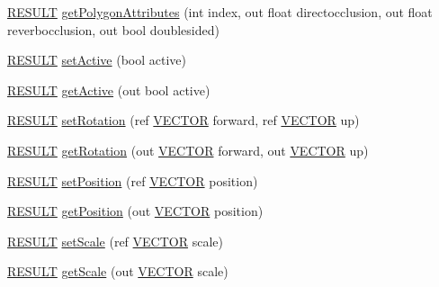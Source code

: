 \begin{DoxyCompactItemize}
\hyperlink{namespace_f_m_o_d_a305d1176ef3f8c8815861a60407ac33d}{R\+E\+S\+U\+LT} \hyperlink{class_f_m_o_d_1_1_geometry_a5993fb0a4a428a9de5262a6254daeeef}{get\+Polygon\+Attributes} (int index, out float directocclusion, out float reverbocclusion, out bool doublesided)
\item 
\hyperlink{namespace_f_m_o_d_a305d1176ef3f8c8815861a60407ac33d}{R\+E\+S\+U\+LT} \hyperlink{class_f_m_o_d_1_1_geometry_a1d58b449d41ca263631a1789f037d6ea}{set\+Active} (bool active)
\item 
\hyperlink{namespace_f_m_o_d_a305d1176ef3f8c8815861a60407ac33d}{R\+E\+S\+U\+LT} \hyperlink{class_f_m_o_d_1_1_geometry_ad588549fa909fcdcc695c7396d553f68}{get\+Active} (out bool active)
\item 
\hyperlink{namespace_f_m_o_d_a305d1176ef3f8c8815861a60407ac33d}{R\+E\+S\+U\+LT} \hyperlink{class_f_m_o_d_1_1_geometry_aa1b290acb751d1464c1cb2c5ff85bf22}{set\+Rotation} (ref \hyperlink{struct_f_m_o_d_1_1_v_e_c_t_o_r}{V\+E\+C\+T\+OR} forward, ref \hyperlink{struct_f_m_o_d_1_1_v_e_c_t_o_r}{V\+E\+C\+T\+OR} up)
\item 
\hyperlink{namespace_f_m_o_d_a305d1176ef3f8c8815861a60407ac33d}{R\+E\+S\+U\+LT} \hyperlink{class_f_m_o_d_1_1_geometry_a4404e35a5d036794d04a090be76d56df}{get\+Rotation} (out \hyperlink{struct_f_m_o_d_1_1_v_e_c_t_o_r}{V\+E\+C\+T\+OR} forward, out \hyperlink{struct_f_m_o_d_1_1_v_e_c_t_o_r}{V\+E\+C\+T\+OR} up)
\item 
\hyperlink{namespace_f_m_o_d_a305d1176ef3f8c8815861a60407ac33d}{R\+E\+S\+U\+LT} \hyperlink{class_f_m_o_d_1_1_geometry_a6a9ffd3421759d70a2b406e3982eaad1}{set\+Position} (ref \hyperlink{struct_f_m_o_d_1_1_v_e_c_t_o_r}{V\+E\+C\+T\+OR} position)
\item 
\hyperlink{namespace_f_m_o_d_a305d1176ef3f8c8815861a60407ac33d}{R\+E\+S\+U\+LT} \hyperlink{class_f_m_o_d_1_1_geometry_abc470dd5be42ffb0007b2046f1195d2b}{get\+Position} (out \hyperlink{struct_f_m_o_d_1_1_v_e_c_t_o_r}{V\+E\+C\+T\+OR} position)
\item 
\hyperlink{namespace_f_m_o_d_a305d1176ef3f8c8815861a60407ac33d}{R\+E\+S\+U\+LT} \hyperlink{class_f_m_o_d_1_1_geometry_a44a7ca44b0fd116a3091f0e8ff1ef5db}{set\+Scale} (ref \hyperlink{struct_f_m_o_d_1_1_v_e_c_t_o_r}{V\+E\+C\+T\+OR} scale)
\item 
\hyperlink{namespace_f_m_o_d_a305d1176ef3f8c8815861a60407ac33d}{R\+E\+S\+U\+LT} \hyperlink{class_f_m_o_d_1_1_geometry_aae31972e889008ca660f0458c7a13459}{get\+Scale} (out \hyperlink{struct_f_m_o_d_1_1_v_e_c_t_o_r}{V\+E\+C\+T\+OR} scale)
\item 

\end{DoxyCompactItemize}
